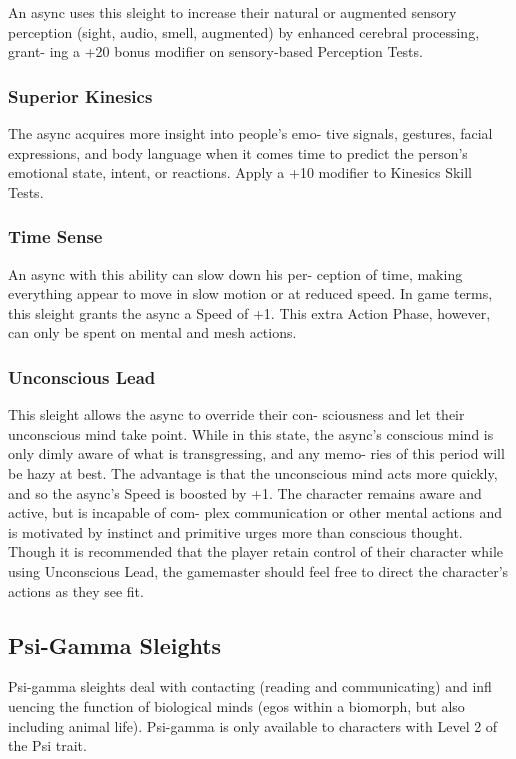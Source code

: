 An async uses this sleight to increase their natural or 
augmented sensory perception (sight, audio, smell, 
augmented) by enhanced cerebral processing, grant-
ing a +20 bonus modifier on sensory-based Perception 
Tests.

\subsubsection{Superior Kinesics}

The async acquires more insight into people's emo-
tive signals, gestures, facial expressions, and body 
language when it comes time to predict the person's 
emotional state, intent, or reactions. Apply a +10 
modifier to Kinesics Skill Tests.

\subsubsection{Time Sense}

An async with this ability can slow down his per-
ception of time, making everything appear to move 
in slow motion or at reduced speed. In game terms, 
this sleight grants the async a Speed of +1. This extra 
Action Phase, however, can only be spent on mental 
and mesh actions.

\subsubsection{Unconscious Lead}

This sleight allows the async to override their con-
sciousness and let their unconscious mind take point. 
While in this state, the async's conscious mind is only 
dimly aware of what is transgressing, and any memo-
ries of this period will be hazy at best. The advantage 
is that the unconscious mind acts more quickly, and 
so the async's Speed is boosted by +1. The character 
remains aware and active, but is incapable of com-
plex communication or other mental actions and is 
motivated by instinct and primitive urges more than 
conscious thought. Though it is recommended that 
the player retain control of their character while using 
Unconscious Lead, the gamemaster should feel free to 
direct the character's actions as they see fit.

\subsection{Psi-Gamma Sleights}

Psi-gamma sleights deal with contacting (reading 
and communicating) and infl uencing the function of 
biological minds (egos within a biomorph, but also 
including animal life). Psi-gamma is only available to 
characters with Level 2 of the Psi trait.

